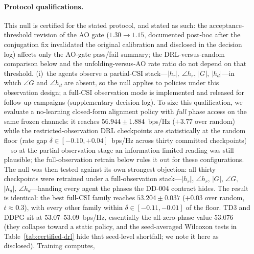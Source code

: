 \paragraph{Protocol qualifications.} This null is certified for the
stated protocol, and stated as such: the acceptance-threshold
revision of the AO gate ($1.30 \to 1.15$, documented post-hoc after
the conjugation fix invalidated the original calibration and disclosed
in the decision log) affects only the AO-gate pass/fail summary; the
DRL-versus-random comparison below and the unfolding-versus-AO rate
ratio do not depend on that threshold. (i)~the agents observe a
partial-CSI stack---$|h_{r}|$, $\angle h_{r}$, $|G|$, $|h_{d}|$---in
which $\angle G$ and $\angle h_{d}$ are absent, so the null applies to
policies under this observation design; a full-CSI observation mode is
implemented and released for follow-up campaigns
(supplementary decision log).
To size this qualification, we evaluate a no-learning closed-form alignment
policy with \emph{full} phase access on the same frozen channels: it reaches
$56.944 \pm 1.884$~bps/Hz ($+3.77$ over random) while the restricted-observation
DRL checkpoints are statistically at the random floor (rate gap
$\delta \in [-0.10, +0.04]$~bps/Hz across thirty committed
checkpoints)---so at the partial-observation stage an information-limited
reading was still plausible; the full-observation retrain below rules it
out for these configurations.
The null was then tested against its own strongest objection: all thirty
checkpoints were retrained under a full-observation stack---$|h_r|$,
$\angle h_r$, $|G|$, $\angle G$, $|h_d|$, $\angle h_d$---handing every agent
the phases the DD-004 contract hides. The result is identical: the best
full-CSI family reaches $53.204 \pm 0.037$ ($+0.03$ over random,
$t \approx 0.3$), with every other family within $\delta \in [-0.11, -0.01]$
of the floor. TD3 and DDPG sit at $53.07$--$53.09$~bps/Hz, essentially the
all-zero-phase value $53.076$ (they collapse toward a static policy, and the
seed-averaged Wilcoxon tests in Table~\ref{tab:certified-drl} hide that
seed-level shortfall; we note it here as disclosed). Training computes,

